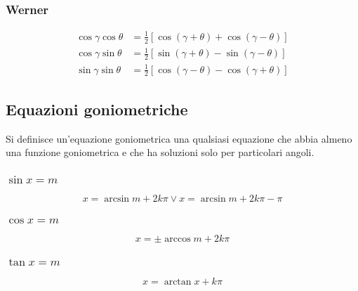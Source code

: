 \subsubsection{Werner}
\begin{align*}
\cos\gamma\cos\theta &= \frac{1}{2}[\cos(\gamma+\theta)+\cos(\gamma-\theta)]\\
\cos\gamma\sin\theta &= \frac{1}{2}[\sin(\gamma+\theta)-\sin(\gamma-\theta)]\\
\sin\gamma\sin\theta &= \frac{1}{2}[\cos(\gamma-\theta)-\cos(\gamma+\theta)]
\end{align*}

\subsection{Equazioni goniometriche}
Si definisce un'equazione goniometrica una qualsiasi equazione che abbia almeno una funzione 
goniometrica e che ha soluzioni solo per particolari angoli.
\subsubsection{$\sin x = m$}
\begin{equation*}
x = \arcsin m + 2k\pi \lor  x = \arcsin m +2k\pi-\pi
\end{equation*}

\subsubsection{$\cos x = m$}
\begin{equation*}
x = \pm\arccos m + 2k\pi
\end{equation*}

\subsubsection{$\tan x = m$}
\begin{equation*}
x = \arctan x + k\pi
\end{equation*}

